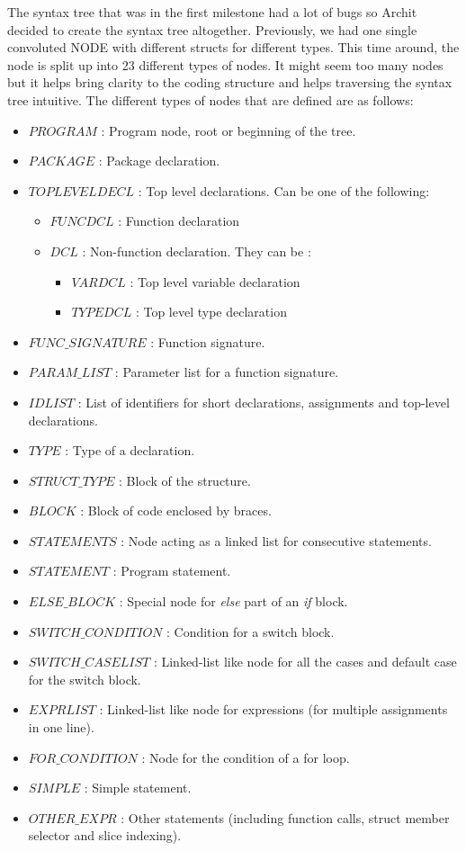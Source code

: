 \documentclass[preprint,12pt]{elsarticle}
\begin{document}
The syntax tree that was in the first milestone had a lot of bugs so Archit decided to create the syntax tree altogether. Previously, we had one single convoluted NODE with different structs for different types. This time around, the node is split up into 23 different types of nodes. It might seem too many nodes but it helps bring clarity to the coding structure and helps traversing the syntax tree intuitive. The different types of nodes that are defined are as follows:
\begin{itemize}
\item $PROGRAM$ : Program node, root or beginning of the tree.
\item $PACKAGE$ : Package declaration.
\item $TOPLEVELDECL$ : Top level declarations. Can be one of the following:
\begin{itemize}
\item $FUNCDCL$ : Function declaration
\item $DCL$ : Non-function declaration. They can be : 
\begin{itemize}
\item $VARDCL$ : Top level variable declaration
\item $TYPEDCL$ : Top level type declaration
\end{itemize}
\end{itemize}
\item $FUNC\_SIGNATURE$ : Function signature.
\item $PARAM\_LIST$ : Parameter list for a function signature.
\item $IDLIST$ : List of identifiers for short declarations, assignments and top-level declarations.
\item $TYPE$ : Type of a declaration.
\item $STRUCT\_TYPE$ : Block of the structure.
\item $BLOCK$ : Block of code enclosed by braces.
\item $STATEMENTS$ : Node acting as a linked list for consecutive statements.
\item $STATEMENT$ : Program statement.
\item $ELSE\_BLOCK$ : Special node for \textit{else} part of an \textit{if} block.
\item $SWITCH\_CONDITION$ : Condition for a switch block.
\item $SWITCH\_CASELIST$ : Linked-list like node for all the cases and default case for the switch block.
\item $EXPRLIST$ : Linked-list like node for expressions (for multiple assignments in one line).
\item $FOR\_CONDITION$ : Node for the condition of a for loop.
\item $SIMPLE$ : Simple statement.
\item $OTHER\_EXPR$ : Other statements (including function calls, struct member selector and slice indexing).
\end{itemize}
\end{document}
